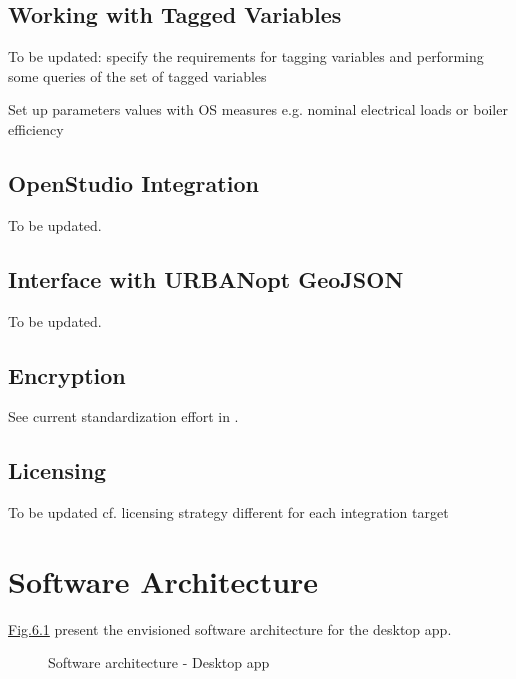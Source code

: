 \documentclass[letterpaper,10pt, openany,english]{sphinxmanual}
\begin{document}
\section{Working with Tagged Variables}
\label{\detokenize{requirements:working-with-tagged-variables}}\label{\detokenize{requirements:par-tagged-variables}}
To be updated: specify the requirements for tagging variables and performing some queries of the set of tagged variables

Set up parameters values with OS measures e.g. nominal electrical loads or boiler efficiency


\section{OpenStudio Integration}
\label{\detokenize{requirements:openstudio-integration}}
To be updated.


\section{Interface with URBANopt GeoJSON}
\label{\detokenize{requirements:interface-with-urbanopt-geojson}}
To be updated.


\section{Encryption}
\label{\detokenize{requirements:encryption}}
See current standardization effort in .


\section{Licensing}
\label{\detokenize{requirements:licensing}}
To be updated cf. licensing strategy different for each integration target


\chapter{Software Architecture}
\label{\detokenize{architecture:software-architecture}}\label{\detokenize{architecture:sec-architecture}}\label{\detokenize{architecture::doc}}
\hyperref[\detokenize{architecture:linkage-architecture-0}]{Fig.\@ \ref{\detokenize{architecture:linkage-architecture-0}}} present the envisioned software architecture for the desktop app.

\begin{figure}[htbp]
\centering
\capstart

\noindent{}
\caption{Software architecture - Desktop app}\label{\detokenize{architecture:linkage-architecture-0}}\end{figure}
\end{document}

